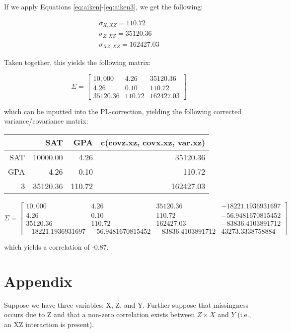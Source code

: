 \documentclass[man, babel,english]{apa}%
\begin{document}
\noindent If we apply Equations \ref{eq:aiken}-\ref{eq:aiken3}, we get the following:

\begin{align}
\nonumber \sigma_{X,XZ} = 110.72 \\
\nonumber \sigma_{Z,XZ} = 35120.36 \\
\nonumber \sigma_{XZ,XZ} = 162427.03 
\end{align}

\noindent Taken together, this yields the following matrix:

 \[
   \Sigma=
  \left[ {\begin{array}{ccc}
  10,000 &4.26 & 35120.36 \\
	4.26 & 0.10 & 110.72 \\
	35120.36 & 110.72 & 162427.03 
  \end{array} } \right]
\]

\noindent which can be inputted into the PL-correction, yielding the following corrected variance/covariance matrix:

\begin{table}[ht]
\centering
\begin{tabular}{rrrr}
  \hline
 & SAT & GPA & c(covz.xz, covx.xz, var.xz) \\ 
  \hline
SAT & 10000.00 & 4.26 & 35120.36 \\ 
  GPA & 4.26 & 0.10 & 110.72 \\ 
  3 & 35120.36 & 110.72 & 162427.03 \\ 
   \hline
\end{tabular}
\end{table}
 \[
   \Sigma=
  \left[ {\begin{array}{cccc}
  10,000 &4.26 & 35120.36 & -18221.1936931697 \\
	4.26 & 0.10 & 110.72 & -56.9481670815452\\
	35120.36 & 110.72 & 162427.03 & -83836.4103891712 \\
	-18221.1936931697 & -56.9481670815452 & -83836.4103891712 & 43273.3338758884
  \end{array} } \right]
\]


\noindent which yields a correlation of -0.87. 



\clearpage
\section{Appendix}
Suppose we have three variables: X, Z, and Y. Further suppose that missingness occurs due to Z and that a non-zero correlation exists between $Z\times X$ and $Y$ (i.e., an XZ interaction is present). 
\end{document}
